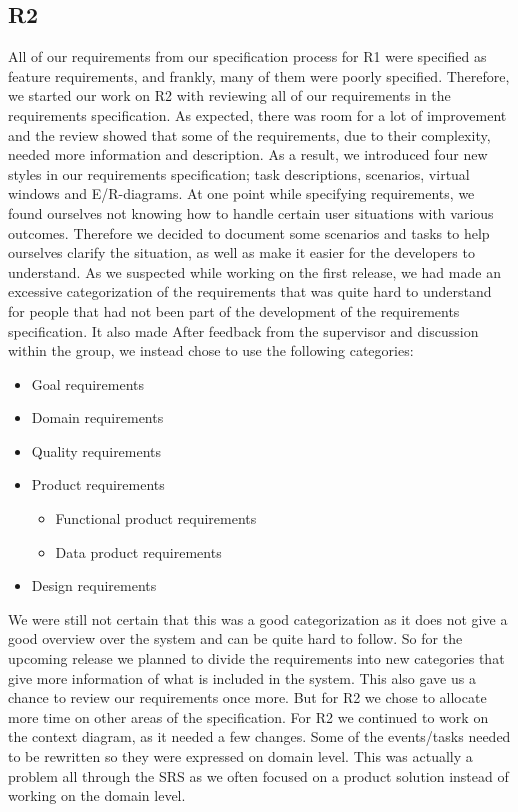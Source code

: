 \documentclass[10pt]{article}
\begin{document}
\subsection{R2}
All of our requirements from our specification process for R1 were specified as feature requirements, and frankly, many of them were poorly specified. Therefore, we started our work on R2 with reviewing all of our requirements in the requirements specification. As expected, there was room for a lot of improvement and the review showed that some of the requirements, due to their complexity, needed more information and description. As a result, we introduced four new styles in our requirements specification; task descriptions, scenarios, virtual windows and E/R-diagrams. At one point while specifying requirements, we found ourselves not knowing how to handle certain user situations with various outcomes. Therefore we decided to document some scenarios and tasks to help ourselves clarify the situation, as well as make it easier for the developers to understand.
\newline
\indent As we suspected while working on the first release, we had made an excessive categorization of the requirements that was quite hard to understand for people that had not been part of the development of the requirements specification. It also made After feedback from the supervisor and discussion within the group, we instead chose to use the following categories: 
\begin{itemize}
\item Goal requirements
\item Domain requirements
\item Quality requirements
\item Product requirements
\begin{itemize}
\item Functional product requirements
\item Data product requirements
\end{itemize} 
\item Design requirements
\end{itemize}
We were still not certain that this was a good categorization as it does not give a good overview over the system and can be quite hard to follow. So for the upcoming release we planned to divide the requirements into new categories that give more information of what is included in the system. This also gave us a chance to review our requirements once more. But for R2 we chose to allocate more time on other areas of the specification. 
\newline
\indent For R2 we continued to work on the context diagram, as it needed a few changes.  Some of the events/tasks needed to be rewritten so they were expressed on domain level. This was actually a problem all through the SRS as we often focused on a product solution instead of working on the domain level. 
\end{document}
